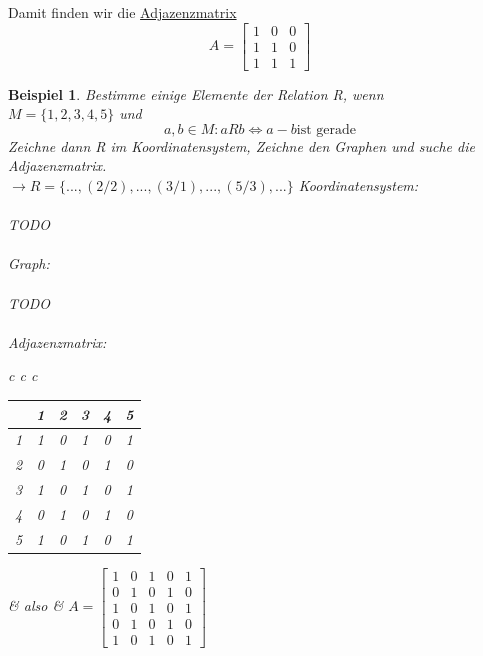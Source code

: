 \documentclass{report}
\newtheorem{myexample}{Beispiel}
\begin{document}
Damit finden wir die \underline{Adjazenzmatrix}
\begin{equation}A = \left[\begin{array}{rrr}
1 & 0 & 0 \\
1 & 1 & 0 \\
1 & 1 & 1\end{array}\right]\end{equation}
\begin{myexample}Bestimme einige Elemente der Relation R, wenn\\
$M = \{1, 2, 3, 4, 5\}$ und
\begin{equation}a,b \in M: a R b \iff a - b \mbox{ist gerade}\end{equation}
Zeichne dann R im Koordinatensystem, Zeichne den Graphen und suche die Adjazenzmatrix.\\
$\to R = \{..., (2/2), ..., (3/1), ..., (5/3), ...\}$
Koordinatensystem:\\\\TODO\\\\
Graph: \\\\TODO\\\\
Adjazenzmatrix:
\begin{center}
\begin{tabular}{c c c}
\begin{tabular}{c | c | c | c | c | c |}
& 1 & 2 & 3 & 4 & 5\\ \hline
1 & 1 & 0 & 1 & 0 & 1\\ \hline
2 & 0 & 1 & 0 & 1 & 0\\ \hline
3 & 1 & 0 & 1 & 0 & 1\\ \hline
4 & 0 & 1 & 0 & 1 & 0\\ \hline
5 & 1 & 0 & 1 & 0 & 1\\ \hline\end{tabular} & also &
$A = \left[\begin{array}{rrrrr}
1 & 0 & 1 & 0 & 1 \\
0 & 1 & 0 & 1 & 0\\
1 & 0 & 1 & 0 & 1\\
0 & 1 & 0 & 1 & 0\\
1 & 0 & 1 & 0 & 1\end{array}\right]$
\end{tabular}
\end{center}
\end{myexample}
\newpage
\end{document}
